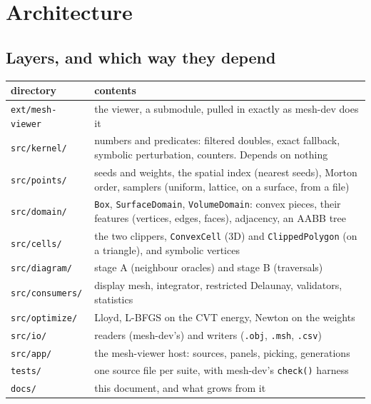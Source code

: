 \documentclass[11pt,a4paper]{article}
\newcommand{\code}[1]{\texttt{#1}}          %
\begin{document}
\section{Architecture}\label{sec:arch}

\subsection{Layers, and which way they depend}\label{ssec:layers}

{\small
\begin{xltabular}{\linewidth}{@{}P{3.2cm} L@{}}
\toprule
directory & contents \\
\midrule
\endhead
\code{ext/mesh-viewer} & the viewer, a submodule, pulled in exactly as mesh-dev does it \\
\code{src/kernel/}     & numbers and predicates: filtered doubles, exact fallback, symbolic
                         perturbation, counters. Depends on nothing \\
\code{src/points/}     & seeds and weights, the spatial index (nearest seeds), Morton order,
                         samplers (uniform, lattice, on a surface, from a file) \\
\code{src/domain/}     & \code{Box}, \code{SurfaceDomain}, \code{VolumeDomain}: convex pieces,
                         their features (vertices, edges, faces), adjacency, an AABB tree \\
\code{src/cells/}      & the two clippers, \code{ConvexCell} (3D) and \code{ClippedPolygon} (on
                         a triangle), and symbolic vertices \\
\code{src/diagram/}    & stage A (neighbour oracles) and stage B (traversals) \\
\code{src/consumers/}  & display mesh, integrator, restricted Delaunay, validators,
                         statistics \\
\code{src/optimize/}   & Lloyd, L-BFGS on the CVT energy, Newton on the weights \\
\code{src/io/}         & readers (mesh-dev's) and writers (\code{.obj}, \code{.msh},
                         \code{.csv}) \\
\code{src/app/}        & the mesh-viewer host: sources, panels, picking, generations \\
\code{tests/}          & one source file per suite, with mesh-dev's \code{check()} harness \\
\code{docs/}           & this document, and what grows from it \\
\bottomrule
\end{xltabular}}
\end{document}
